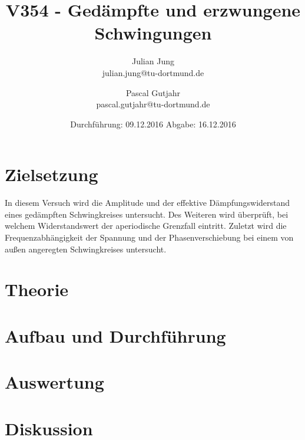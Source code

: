 

\title{V354 - Gedämpfte und erzwungene Schwingungen}
\author{Julian Jung \\ julian.jung@tu-dortmund.de
  \and Pascal Gutjahr \\ pascal.gutjahr@tu-dortmund.de}
  \date{Durchführung: 09.12.2016
  \hspace{3em}
  Abgabe: 16.12.2016}
  
\maketitle
\newpage
\tableofcontents
\newpage
\section{Zielsetzung}
In diesem Versuch wird die Amplitude und der effektive Dämpfungswiderstand eines
gedämpften Schwingkreises untersucht. Des Weiteren wird überprüft, bei
welchem Widerstandswert der aperiodische Grenzfall eintritt. Zuletzt wird die
Frequenzabhängigkeit der Spannung und der Phasenverschiebung bei einem von
außen angeregten Schwingkreises untersucht.
\section{Theorie}
 
\section{Aufbau und Durchführung}
 
\section{Auswertung}
 
\section{Diskussion}
 
\printbibliography

